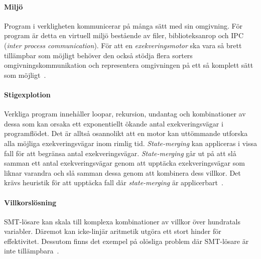 \paragraph{Miljö} Program i verkligheten kommunicerar på många sätt med sin
omgivning. För program är detta en virtuell miljö bestående av filer,
biblioteksanrop och IPC (\emph{inter process communication}). För att en
\textit{exekveringsmotor} ska vara så brett tillämpbar som möjligt behöver den
också stödja flera sorters omgivningskommunikation och representera omgivningen
på ett så komplett sätt som möjligt~\cite{survey_symb_exc}.

\paragraph{Stigexplotion} Verkliga program innehåller loopar, rekursion,
undantag och kombinationer av dessa som kan orsaka ett exponentiellt ökande
antal exekveringsvägar i programflödet. Det är alltså osannolikt att en motor
kan uttömmande utforska alla möjliga exekveringsvägar inom rimlig tid.
\emph{State-merging} kan appliceras i vissa fall för att begränsa antal
exekveringsvägar. \emph{State-merging} går ut på att slå samman ett antal
exekveringsvägar genom att upptäcka exekveringsvägar som liknar varandra och
slå samman dessa genom att kombinera dess villkor. Det krävs heuristik för att
upptäcka fall där \emph{state-merging} är applicerbart~\cite{survey_symb_exc}.

\paragraph{Villkorslösning} SMT-lösare kan skala till komplexa kombinationer av
villkor över hundratals variabler. Däremot kan icke-linjär aritmetik utgöra ett
stort hinder för effektivitet. Dessutom finns det exempel på olösliga problem
där SMT-lösare är inte tillämpbara~\cite{survey_symb_exc}.


